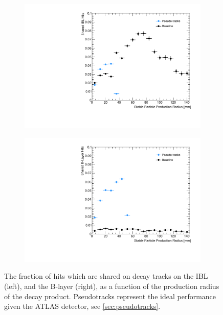 \begin{figure}[!htbp]
    \centering
    \begin{subfigure}{.48\textwidth}
      \centering
      \includegraphics[width=\textwidth]{chapters/3.tracking/figs/po_nSharedOnIBL_From_B_DL.pdf}
    \end{subfigure}%
    \begin{subfigure}{.48\textwidth}
      \centering
      \includegraphics[width=\textwidth]{chapters/3.tracking/figs/po_nSharedOnBL_From_B_DL.pdf}
    \end{subfigure}
    \caption{
      The fraction of hits which are shared on \bhadron decay tracks on the IBL (left), and the B-layer (right), as a function of the production radius of the \bhadron decay product. 
      Pseudotracks represent the ideal performance given the ATLAS detector, see \cref{sec:pseudotracks}.
    }
    \label{fig:shared_hits_pseudo}
\end{figure}



